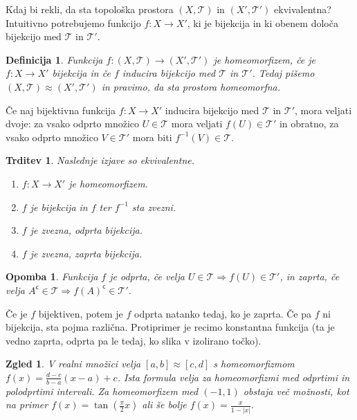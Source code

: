 \documentclass[10pt, a4paper]{article}
\newtheorem{trditev}[izr]{Trditev}
\newtheorem{defi}{Definicija}[section]
\newenvironment{noticeB}{%
  \tcolorbox[%
  notitle,
  empty,
  enhanced,  %
  breakable,
  coltext=black,
  colback=white, 
  fontupper=\rmfamily,
  parbox=false,
  noparskip,
  sharp corners,
  boxrule=-1pt,  %
  frame hidden,
  left=7pt,  %
  right=7pt,
  top=5pt,
  bottom=5pt,
  before skip=2.5ex plus 2pt,
  after skip=2.5ex plus 2pt,
  borderline west = {1.5pt}{-0.1pt}{blue!30!black}, %
  overlay unbroken and last={%
    \draw[color=black, line width=1.25pt]
    ($(frame.south west)+(1.pt, -0.1pt)$) -- ++(2em, 0);
  }
  ]}
{\endtcolorbox}
\newenvironment{definicija}{\begin{defi}\begin{noticeB}}{%
    \end{noticeB}\end{defi}}
\newtheorem*{opomba}{Opomba}
\newtheorem{zgled}{Zgled}[section]
\newcommand{\stcomp}[1]{{#1}^{\mathsf{c}}}
\newcommand{\topo}[1]{\mathcal{#1}}
\begin{document}
Kdaj bi rekli, da sta topološka prostora $(X, \mathcal{T})$ in $(X', \mathcal{T}')$ ekvivalentna?
Intuitivno potrebujemo funkcijo $f: X \to X'$, ki je bijekcija in ki obenem določa bijekcijo med 
$\mathcal{T}$ in $\mathcal{T}'$.

\begin{definicija}
  Funkcija $f: (X, \mathcal{T}) \to (X', \mathcal{T}')$ je homeomorfizem, če je $f: X \to X'$ bijekcija
  in če $f$ inducira bijekcijo med $\mathcal{T}$ in $\mathcal{T}'$. Tedaj pišemo $(X, \mathcal{T}) \approx (X', \mathcal{T}')$
  in pravimo, da sta prostora homeomorfna.
\end{definicija}

Če naj bijektivna funkcija $f: X \to X'$ inducira bijekcijo med $\mathcal{T}$ in $\mathcal{T}'$, mora veljati dvoje:
za vsako odprto množico $U \in \mathcal{T}$ mora veljati $f(U) \in \topo{T}'$ in obratno, 
za vsako odprto množico $V \in \topo{T}'$ mora biti $f^{-1} (V) \in \topo{T}$. 

\begin{trditev}
  Naslednje izjave so ekvivalentne.
  \begin{enumerate}
    \item $f: X \to X'$ je homeomorfizem.
    \item $f$ je bijekcija in $f$ ter $f^{-1}$ sta zvezni.
    \item $f$ je zvezna, odprta bijekcija.
    \item $f$ je zvezna, zaprta bijekcija.
  \end{enumerate}
\end{trditev}

\begin{opomba}
  Funkcija $f$ je odprta, če velja $U \in \mathcal{T} \Rightarrow f(U) \in \mathcal{T}'$, in 
  zaprta, če velja $\stcomp{A} \in \mathcal{T} \Rightarrow \stcomp{f(A)} \in \mathcal{T}'$.
\end{opomba}

Če je $f$ bijektiven, potem je $f$ odprta natanko tedaj, ko je zaprta.
Če pa $f$ ni bijekcija, sta pojma različna. Protiprimer je recimo konstantna funkcija (ta je vedno zaprta, odprta pa le tedaj,
ko slika v izolirano točko).

\begin{zgled}
  V realni množici velja $[a, b] \approx [c, d]$ s homeomorfizmom $f(x) = \frac{d - c}{b - a}(x-a) + c$.
  Ista formula velja za homeomorfizmi med odprtimi in polodprtimi intervali. Za homeomorfizem med $(-1, 1)$
  obstaja več možnosti, kot na primer $f(x) = \tan \left(\frac{\pi}{2} x\right)$ ali še bolje $f(x) = \frac{x}{1 - |x|}$.
\end{zgled}
\end{document}
